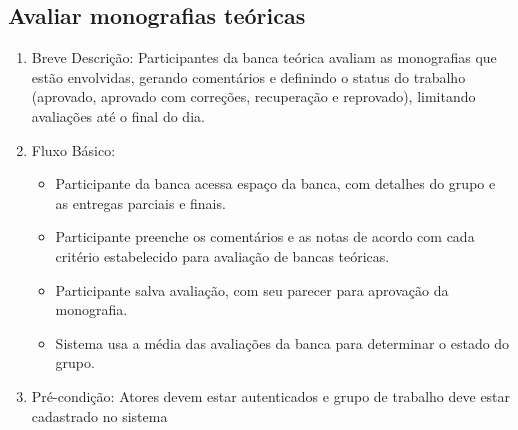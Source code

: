 \subsection{Avaliar monografias teóricas}
\begin{enumerate}
    \item Breve Descrição: Participantes da banca teórica avaliam as monografias que estão envolvidas, gerando comentários e definindo o status do trabalho (aprovado, aprovado com correções, recuperação e reprovado), limitando avaliações até o final do dia.
    \item Fluxo Básico:
    \begin{itemize}
        \item Participante da banca acessa espaço da banca, com detalhes do grupo e as entregas parciais e finais.
        \item Participante preenche os comentários e as notas de acordo com cada critério estabelecido para avaliação de bancas teóricas.
        \item Participante salva avaliação, com seu parecer para aprovação da monografia.
        \item Sistema usa a média das avaliações da banca para determinar o estado do grupo.
    \end{itemize}
    \item Pré-condição: Atores devem estar autenticados e grupo de trabalho deve estar cadastrado no sistema
\end{enumerate}


